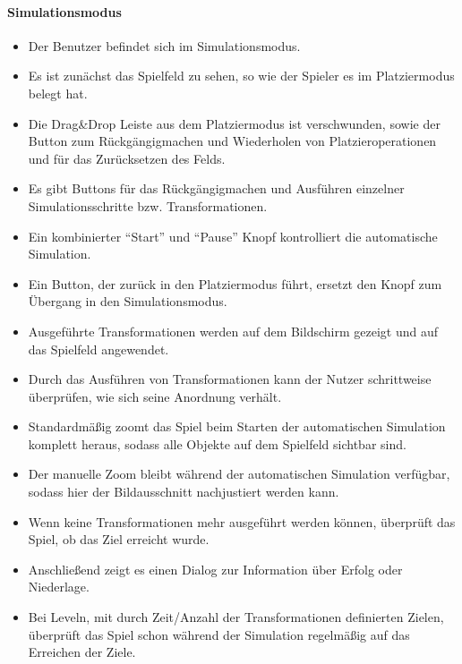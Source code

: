 \paragraph{Simulationsmodus}
\begin{itemize}
\item Der Benutzer befindet sich im Simulationsmodus.
\item Es ist zunächst das Spielfeld zu sehen, so wie der Spieler es im Platziermodus belegt hat.
\item Die Drag\&Drop Leiste aus dem Platziermodus ist verschwunden, sowie der 
Button zum Rückgängigmachen und Wiederholen von 
Platzieroperationen und für das Zurücksetzen des Felds.
\item Es gibt Buttons für das Rückgängigmachen und Ausführen 
einzelner Simulationsschritte bzw. Transformationen.
\item Ein kombinierter "`Start"' und "`Pause"' Knopf kontrolliert die automatische Simulation.
\item Ein Button, der zurück in den Platziermodus führt, ersetzt den Knopf zum Übergang 
in den Simulationsmodus.
\item Ausgeführte Transformationen werden auf dem Bildschirm gezeigt und auf das Spielfeld angewendet.
\item Durch das Ausführen von Transformationen kann der Nutzer schrittweise
überprüfen, wie sich seine Anordnung verhält.
\item Standardmäßig zoomt das Spiel beim Starten der automatischen Simulation komplett heraus, sodass alle Objekte auf dem Spielfeld sichtbar sind.
\item Der manuelle Zoom bleibt während der automatischen Simulation verfügbar, sodass hier der Bildausschnitt nachjustiert werden kann.
\item Wenn keine Transformationen mehr ausgeführt werden können, überprüft das Spiel, ob das Ziel erreicht
wurde.
\item Anschließend zeigt es einen Dialog zur Information über Erfolg oder Niederlage.
\item Bei Leveln, mit durch Zeit/Anzahl der Transformationen definierten Zielen,
überprüft das Spiel schon während der Simulation regelmäßig auf das Erreichen
der Ziele.
\end{itemize}

